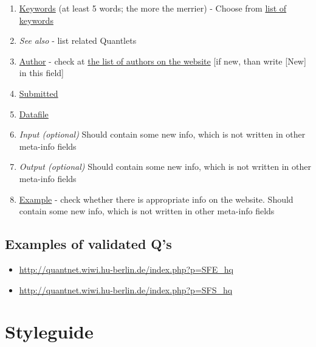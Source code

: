 \documentclass{article}
\begin{document}
\begin{enumerate}[label*=\arabic*.]
\begin{enumerate}[label*=\arabic*.]
		\item \underline{Keywords} (at least 5 words; the more the merrier) - 
		Choose from \href{http://quantnet.wiwi.hu-berlin.de/index.php?p=searchResults&w=allkeywords&sort			=f}{list of keywords}
		\item \textit{See also} - list related Quantlets
		\item \underline{Author} - check at  \href{http://quantnet.hu-berlin.de/}{the list of  authors on the 		website} [if new, than write [New] in this field]
		\item \underline{Submitted}
		\item \underline{Datafile}
		\item \textit{Input (optional)} Should contain some new info, which is not written in other meta-info fields
		\item \textit{Output (optional)} Should contain some new info, which is not written in other meta-info fields
		\item \underline{Example} - check whether there is appropriate info on the website. Should contain some new info, which is not written in other meta-info fields
	\end{enumerate}

\end{enumerate}

\subsection*{Examples of validated Q's}
\begin{itemize}
	\item \url{http://quantnet.wiwi.hu-berlin.de/index.php?p=SFE_hq}
	\item \url{http://quantnet.wiwi.hu-berlin.de/index.php?p=SFS_hq}
\end{itemize}

\section*{Styleguide}
\end{document}
